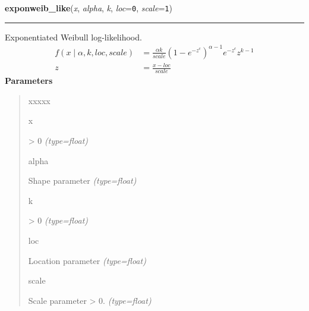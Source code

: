 \hspace{.8\funcindent}\begin{boxedminipage}{\funcwidth}

    \raggedright \textbf{exponweib\_like}(\textit{x}, \textit{alpha}, \textit{k}, \textit{loc}={\tt 0}, \textit{scale}={\tt 1})

    \vspace{-1.5ex}

    \rule{\textwidth}{1pt}
\setlength{\parskip}{2ex}

Exponentiated Weibull log-likelihood.
\begin{equation*}\begin{split}f(x \mid \alpha,k,loc,scale)  & = \frac{\alpha k}{scale} (1-e^{-z^c})^{\alpha-1} e^{-z^c} z^{k-1} \\z & = \frac{x-loc}{scale}\end{split}\end{equation*}\setlength{\parskip}{1ex}
      \textbf{Parameters}
      \vspace{-1ex}

      \begin{quote}
        \begin{Ventry}{xxxxx}

          \item[x]


{\textgreater} 0
            {\it (type=float)}

          \item[alpha]


Shape parameter
            {\it (type=float)}

          \item[k]


{\textgreater} 0
            {\it (type=float)}

          \item[loc]


Location parameter
            {\it (type=float)}

          \item[scale]


Scale parameter {\textgreater} 0.
            {\it (type=float)}

        \end{Ventry}

      \end{quote}

    \end{boxedminipage}

    \label{pymc:distributions:gamma_like}


